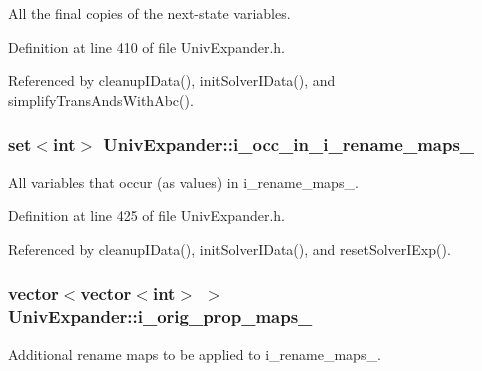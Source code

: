 All the final copies of the next-\/state variables. 



Definition at line 410 of file Univ\-Expander.\-h.



Referenced by cleanup\-I\-Data(), init\-Solver\-I\-Data(), and simplify\-Trans\-Ands\-With\-Abc().

\hypertarget{classUnivExpander_a44acd8709f042e39071913fb12303b0d}{
\subsubsection[{i\-\_\-occ\-\_\-in\-\_\-i\-\_\-rename\-\_\-maps\-\_\-}]{\setlength{\rightskip}{0pt plus 5cm}set$<$int$>$ Univ\-Expander\-::i\-\_\-occ\-\_\-in\-\_\-i\-\_\-rename\-\_\-maps\-\_\-\hspace{0.3cm}{\ttfamily [protected]}}}\label{classUnivExpander_a44acd8709f042e39071913fb12303b0d}


All variables that occur (as values) in i\-\_\-rename\-\_\-maps\-\_\-. 



Definition at line 425 of file Univ\-Expander.\-h.



Referenced by cleanup\-I\-Data(), init\-Solver\-I\-Data(), and reset\-Solver\-I\-Exp().

\hypertarget{classUnivExpander_a56e747b1df6cfd250707384b593b13a7}{
\subsubsection[{i\-\_\-orig\-\_\-prop\-\_\-maps\-\_\-}]{\setlength{\rightskip}{0pt plus 5cm}vector$<$vector$<$int$>$ $>$ Univ\-Expander\-::i\-\_\-orig\-\_\-prop\-\_\-maps\-\_\-\hspace{0.3cm}{\ttfamily [protected]}}}\label{classUnivExpander_a56e747b1df6cfd250707384b593b13a7}


Additional rename maps to be applied to i\-\_\-rename\-\_\-maps\-\_\-. 


